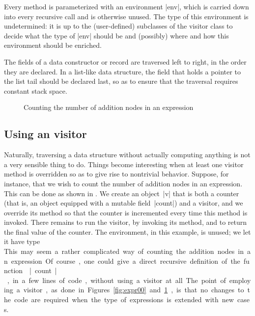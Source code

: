 \documentclass[11pt,a4paper,twoside]{article}
\begin{document}
Every method is parameterized with an environment \oc|env|, which is carried
down into every recursive call and is otherwise unused. The type of this
environment is undetermined: it is up to the (user-defined) subclasses of the
visitor class to decide what the type of \oc|env| should be and (possibly)
where and how this environment should be enriched.


The fields of a data constructor or record are traversed left to right, in the
order they are declared. In a list-like data structure, the field that holds a
pointer to the list tail should be declared last, so as to ensure that the
traversal requires constant stack space.


\begin{figure}[t]
\caption{Counting the number of addition nodes in an expression}
\label{fig:expr04}
\end{figure}

\subsection{Using an \iter visitor}
\label{sec:intro:iter:usage}

Naturally, traversing a data structure without actually computing anything is
not a very sensible thing to do. Things become interesting when at least one
visitor method is overridden so as to give rise to nontrivial behavior.
Suppose, for instance, that we wish to count the number of addition nodes in
an expression. This can be done as shown in . We create an
object~\oc|v| that is both a counter (that is, an object equipped with a
mutable field~\oc|count|) and a visitor, and we override its method
 so that the counter is incremented every time this
method is invoked. There remains to run the visitor, by invoking its
 method, and to return the final value of the counter. The
environment, in this example, is unused; we let it have type \unit.

This may seem a rather complicated way of counting the addition nodes in an
expression. Of course, one could give a direct recursive definition of the
function \oc|count|, in a few lines of code, without using a visitor at all.
The point of employing a visitor, as done in Figures~\ref{fig:expr00}
and~\ref{fig:expr04}, is that no changes to the code are required when the
type of expressions is extended with new cases.
\end{document}
